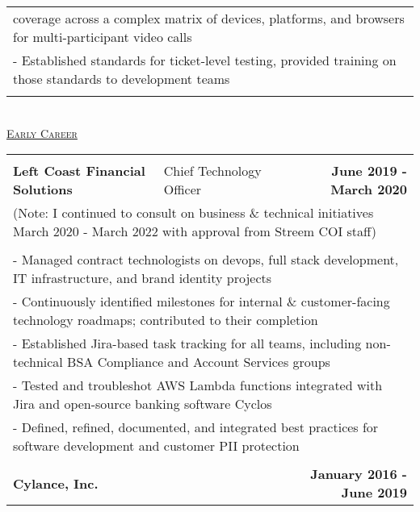 \documentclass[letterpaper]{article}
\begin{document}
\begin{center}
\begin{tabular}{p{}p{}r}
			\\
				\multicolumn{3}{p{\textwidth}}{\quad\quad\quad  coverage across a complex matrix of devices, platforms, and browsers for multi-participant video calls }
			\\
				\multicolumn{3}{p{\textwidth}}{\quad\quad - Established standards for ticket-level testing, provided training on those standards to development teams}
			\\
			\\
		\end{tabular} \\
		\vspace{2.25in}
		\underline{\large \scshape Early Career}
		\begin{tabular}{p{}p{}r}
		\\
			\\
				\textbf{Left Coast Financial Solutions} &
				\quad\quad\quad\quad\quad Chief Technology Officer &
				\textbf{June 2019 - March 2020\quad}
			\\
				\multicolumn{3}{p{\textwidth}}{(Note: I continued to consult on business \& technical initiatives March 2020 - March 2022 with approval from Streem COI staff)}
			\\
			\\
				\multicolumn{3}{p{\textwidth}}{\quad\quad - Managed contract technologists on devops, full stack development, IT infrastructure, and brand identity projects} 
			\\
				\multicolumn{3}{p{\textwidth}}{\quad\quad - Continuously identified milestones for internal \& customer-facing technology roadmaps; contributed to their completion}  
			\\
				\multicolumn{3}{p{\textwidth}}{\quad\quad - Established Jira-based task tracking for all teams, including non-technical BSA Compliance and Account Services groups}
			\\
				\multicolumn{3}{p{\textwidth}}{\quad\quad - Tested and troubleshot AWS Lambda functions integrated with Jira and open-source banking software Cyclos} 
			\\
				\multicolumn{3}{p{\textwidth}}{\quad\quad - Defined, refined, documented, and integrated best practices for software development and customer PII protection}
			\\
			\\
				\textbf{Cylance, Inc.} & &
				\textbf{January 2016 - June 2019\quad}
			\\		%

\end{tabular}
\end{center}
\end{document}
